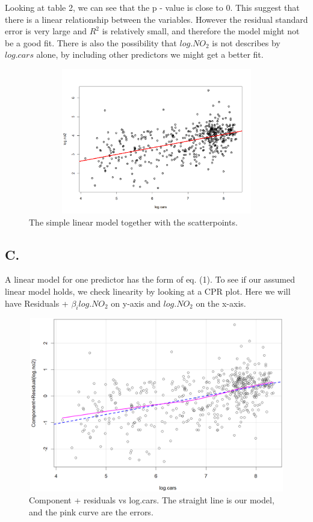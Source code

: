\documentclass[a4paper,12pt]{article}
\begin{document}
Looking at table 2, we can see that the p - value is close to 0. This suggest that there is a linear relationship between the variables. However the residual standard error is very large and $R^2$ is relatively small, and therefore the model might not be a good fit. There is also the possibility that $log.NO_2$ is not describes by $log.cars$ alone, by including other predictors we might get a better fit.

\begin{figure}[H]
\centerline{\includegraphics[width=4.5in, height=2.5in]{Fit_scatterplot(B).png}}
\caption{The simple linear model together with the scatterpoints.  }
\label{fig}
\end{figure}

\subsection*{C. }
A linear model for one predictor has the form of eq. (1). To see if our assumed linear model holds, we check linearity by looking at a CPR plot. Here we will have  Residuals + $\beta_i log.NO_2$ on y-axis and $log.NO_2$ on the x-axis.\\




\begin{figure}[H]
\centerline{\includegraphics[width=4.5in, height=3in]{crPlot(C).png}}
\caption{Component + residuals vs log.cars. The straight line is our model, and the pink curve are the errors.}
\label{fig}
\end{figure}
\end{document}
